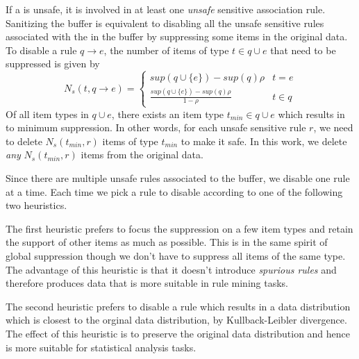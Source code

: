 If a \qid is unsafe, it is involved in at least one {\em unsafe} sensitive
association rule. Sanitizing the \qid buffer is equivalent to disabling all
the unsafe sensitive rules associated with the \qids in the buffer by
suppressing some items in the original data. To disable a rule $q \rightarrow
e$, the number of items of type $t \in q\cup e$ that need to be suppressed is
given by
\[N_s(t, q\rightarrow e)=
\begin{cases}
sup(q\cup \{e\})-sup(q)\rho & t=e  \\
\frac{sup(q\cup \{e\})-sup(q)\rho}{1-\rho} & t\in q %
\end{cases} \]
Of all item types in $q\cup e$, there exists an item type $t_{min} \in q\cup
e$ which results in to minimum suppression. In other words, for each unsafe
sensitive rule $r$, we need to delete $N_s(t_{min}, r)$ items of type
$t_{min}$ to make it safe. In this work, we delete {\em any} $N_s(t_{min},
r)$ items from the original data.

Since there are multiple unsafe rules associated to the buffer, we disable one
rule at a time. Each time we pick a rule to disable according to one of the following
two heuristics.

The first heuristic prefers to focus the suppression on a few item types and
retain the support of other items as much as possible.
This is in the same spirit of global
suppression though we don't have to suppress all items of the same type. The
advantage of this heuristic is that it doesn't introduce {\em spurious rules}
and therefore produces data that is more suitable in rule mining tasks.

The second heuristic prefers to disable a rule which results in a data distribution
which is closest to the orginal data distribution, by Kullback-Leibler divergence.
The effect of this heuristic is to preserve the original data distribution and hence
is more suitable for statistical analysis tasks.

